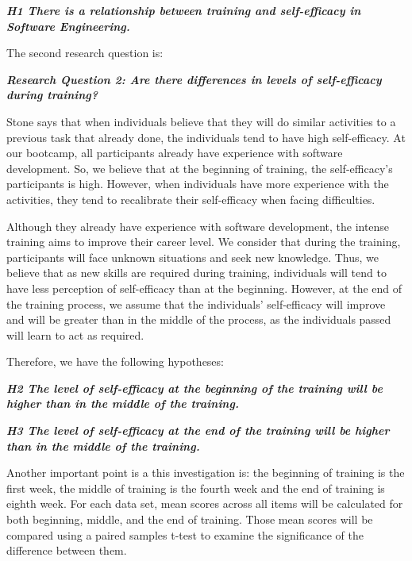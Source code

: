 \documentclass[10pt, conference]{IEEEtran}
\begin{document}
\textbf{\textit{H1 There is a relationship between training and self-efficacy in Software Engineering.}}
 \newline
   
The second research question is:
 \newline
 
\textbf{\textit{Research Question 2:  Are there differences in levels of self-efficacy during training?}}   
 \newline
 
 Stone \cite{stone1994overconfidence} says that when individuals believe that they will do similar activities to a previous task that already done, the individuals tend to have high self-efficacy. At our bootcamp, all participants already have experience with software development. So, we believe that at the beginning of training, the self-efficacy's participants is high. However, when individuals have more experience with the activities, they tend to recalibrate their self-efficacy when facing difficulties.

Although they already have experience with software development, the intense training aims to improve their career level. We consider that during the training, participants will face unknown situations and seek new knowledge. Thus, we believe that as new skills are required during training, individuals will tend to have less perception of self-efficacy than at the beginning. However, at the end of the training process, we assume that the individuals' self-efficacy will improve and will be greater than in the middle of the process, as the individuals passed will learn to act as required.

Therefore, we have the following hypotheses:
 \newline

\textbf{\textit{H2 The level of self-efficacy at the beginning of the training will be higher than in the middle of the training.}} \newline

\textbf{\textit{H3 The level of self-efficacy at the end of the training will be higher than in the middle of the training.}}
 \newline


Another important point is a this investigation is: the beginning of training is the first week, the middle of training is the fourth week and the end of training is eighth week. For each data set, mean scores across all items will be calculated for both beginning, middle, and the end of training. Those mean scores will be compared using a paired samples t-test to examine the significance of the difference between them. 
\end{document}
